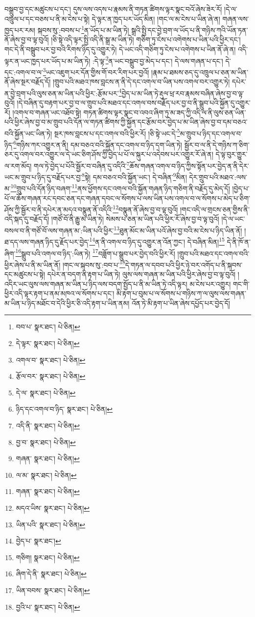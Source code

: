 བསྒྲུབ་བྱ་དང་མཚུངས་པ་དང་། དུས་ལས་འདས་པ་རྣམས་ནི་གཏན་ཚིགས་ལྟར་སྣང་བའོ་ཞེས་ཟེར་རོ། །དེ་ལ་འཁྲུལ་པ་དང་བཅས་པ་ནི་མ་ངེས་པ་སྟེ། དེ་ལྟར་ན་ཁྱད་པར་ཡོད་མིན། །གང་ལ་མ་ངེས་པ་ཡིན་ཞེ་ན། གཞན་ལས་ཁྱད་པར་རམ། སྐབས་སུ་:བབས་པ་\footnote{བབ་པ་  སྣར་ཐང་།  པེ་ཅིན། }ན་ཡོད་པ་མ་ཡིན་ཏེ། སྒྲའི་སྤྱི་དང་བྱེ་བྲག་ལ་ཡོད་པ་ནི་གཉིས་ཀའི་ཡོན་ཏན་ནོ་ཞེས་བྱ་བ་ལྟ་བུའོ། །ཅི་སྟེ་འདི་ལྟར་སྤྱི་འདི་ནི་སྒྲ་མ་ཡིན་ཏེ། གཅིག་ཏུ་ངེས་པ་འགེགས་པ་ཡིན་པའི་ཕྱིར་དང་། གང་དེ་ནི་བསྒྲུབ་པར་བྱ་བའི་རིགས་ཉིད་དུ་འགྱུར་ཏེ། དེ་ཡང་འདི་གཅིག་ཏུ་ངེས་པ་འགེགས་པ་ཡིན་ནོ་ཞེ་ན། འདི་ལྟར་ན་ཡང་ཁྱད་པར་ཡོད་པ་མ་ཡིན་ཏེ། :དེ་ལྟ་\footnote{དེ་ལྟར་  སྣར་ཐང་།  པེ་ཅིན། }ན་ཡང་བསྒྲུབ་བྱ་མེད་པ་དང་། དེ་ལས་གཞན་པ་དང་། དེ་དང་:འགལ་བ་ལ་\footnote{འགལ་བ་  སྣར་ཐང་།  པེ་ཅིན། }ཡང་འཇུག་པར་དོན་གྱིས་གོ་བར་རིག་པར་བྱའོ། །རྣམ་པ་ཐམས་ཅད་དུ་འཁྲུལ་པ་ཅན་མ་ཡིན་ནོ་ཞེས་སྔར་བརྗོད་དོ། །གྲུབ་པའི་མཐའ་ཁས་བླངས་ན་ནི་དེ་དང་འགལ་བ་ཡིན་པས་འགལ་བར་འགྱུར་ཏེ། དཔེར་ན་བྱེ་བྲག་པའི་ལུས་ཅན་མ་ཡིན་པའི་ཕྱིར་:རྩོམ་པར་\footnote{རྩོལ་བར་  སྣར་ཐང་།  པེ་ཅིན། }བྱེད་པ་མ་ཡིན་ཏེ་རྡུལ་ཕྲ་རབ་རྣམས་བཞིན་ཞེས་བྱ་བ་ལྟ་བུའོ། །དེ་བཞིན་དུ་བརྟག་པར་བྱ་བ་ལ་གྲུབ་པའི་མཐའ་དང་འགལ་བས་བརྗོད་པར་བྱ་བ་ནི་སྒྲུབ་པའི་སྐྱོན་དུ་འགྱུར་རོ། །འགལ་བ་གཞན་ཡང་འཐོབ་སྟེ། གཏན་ཚིགས་ལྟར་སྣང་བ་འབའ་ཞིག་ཏུ་མ་ཟད་ཀྱི་འདི་ལ་ནི་ལུས་ཅན་ཡིན་པའི་ཕྱིར་ཞེས་བྱ་བ་མ་གྲུབ་པའི་དོན་ལ་གཏན་ཚིགས་ཀྱི་སྐྱོན་དང་རྩོམ་བར་བྱེད་པ་མ་ཡིན་ཞེས་བྱ་བ་དམ་བཅའ་བའི་སྐྱོན་ཡང་ཡིན་ཏེ། སྔར་ཁས་བླངས་པ་དང་འགལ་བའི་ཕྱིར་རོ། །ཅི་སྟེ་ཡང་དེ་\footnote{དེ་ལ་  སྣར་ཐང་།  པེ་ཅིན། }མ་གྲུབ་པ་ཉིད་དང་འགལ་བ་ཉིད་\footnote{ཉིད་དང་འགལ་བ་ཉིད་  སྣར་ཐང་།  པེ་ཅིན། }གཉིས་ཀར་འགྱུར་ན་ནི། དམ་བཅའ་བའི་སྐྱོན་དང་འགལ་བ་ཉིད་དག་ཡིན་ཏེ། སྦྱོར་བ་ལ་ནི་དེ་གཉིས་ཀ་ཅིག་ཅར་དུ་འགལ་བར་འགྱུར་ལ་དེ་ཡང་ཅིག་ཤོས་ཀྱི་བྱེད་པ་པོ་ལ་སྐུར་པ་འདེབས་པར་འགྱུར་རོ་ཞེ་ན། དེ་ལྟ་བུར་གྱུར་ལ་རག་མོད། གལ་ཏེ་བྱེད་པ་པོའི་སྦྱོར་བ་བཞིན་དུ་འདིའི་\footnote{འདི་ནི་  སྣར་ཐང་།  པེ་ཅིན། }ཆོས་གཞན་འགལ་བ་ཉིད་ཀྱིས་སྟོན་པར་བྱེད་ན་ནི་དེར་ཡང་མ་གྲུབ་པ་ཉིད་དུ་བརྗོད་པར་བྱ་\footnote{བྱ་བ་  སྣར་ཐང་།  པེ་ཅིན། }སྟེ། དམ་བཅའ་བའི་སྐྱོན་ཡང་། དེ་བཞིན་\footnote{གཞན་  སྣར་ཐང་།  པེ་ཅིན། }མིན། དེར་གྲུབ་པའི་མཐའ་:ལས་མ་\footnote{ལ་མ་  སྣར་ཐང་།  པེ་ཅིན། }གྲུབ་པའི་དོན་ཉིད་བཞག་\footnote{གཞན་  སྣར་ཐང་།  པེ་ཅིན། }ནས་ཕྱོགས་དང་འགལ་བའི་སྐྱོན་གཞན་ཉིད་གཅིག་ནི་བརྗོད་དུ་མེད་དོ། །བྱེད་པ་པོ་ལ་ཆོས་གཞན་རང་དབང་ཅན་དང་གཞན་དབང་ལ་སོགས་པ་ལས་ཡིན་པས་འགལ་བ་ལ་སོགས་པ་མེད་པ་ཅིག་ཤོས་ཀྱི་སྦྱོར་བ་ནི་དཔེར་ན་མདའ་བསྣུན་ནོ་འདིའི་\footnote{མདའ་ཡིས་  སྣར་ཐང་།  པེ་ཅིན། }བསྣུན་ནོ་ཞེས་བྱ་བ་ལྟ་བུའོ། །གང་འདི་ལ་གྲངས་ཅན་གྱིས་ནི་འདི་སྐད་དུ་བརྗོད་དོ། །གཙོ་བོ་ནི་རྒྱུ་མ་ཡིན་ཏེ། སེམས་པ་ཅན་མ་ཡིན་པའི་ཕྱིར་རོ་ཞེས་བྱ་བ་ལྟ་བུའོ། །དེ་ལ་ཡང་བསལ་བ་ནི་གཙོ་བོ་ལས་གཞན་མ་:ཡིན་པའི་ཕྱིར་\footnote{ཡིན་པའི་  སྣར་ཐང་།  པེ་ཅིན། }ཐུན་མོང་མ་ཡིན་པའོ་ཞེས་བྱ་བའི་མ་ངེས་པ་ཉིད་ཡིན་ནོ། །ཐ་དད་ལས་གཞན་ཉིད་དུ་རྗོད་པར་བྱེད་\footnote{བྱེད་པ་  སྣར་ཐང་། }ན་ནི་འགལ་བ་ཉིད་དུ་འགྱུར་ན་འོན་ཀྱང་། དེ་བཞིན་མིན།\footnote{གཅིག།  སྣར་ཐང་།  པེ་ཅིན། } དེ་ནི་ཁོ་ན་ཞིག་\footnote{ཞིག་དེ་ནི་  སྣར་ཐང་།  པེ་ཅིན། }སྒྲུབ་པའི་འགལ་བ་ཉིད་:ཡིན་ཏེ། \footnote{ཡིན་བབས་  སྣར་ཐང་།  པེ་ཅིན། }བཟློག་པ་སྒྲུབ་པར་བྱེད་བའི་ཕྱིར་རོ། །གྲུབ་པའི་མཐའ་དང་འགལ་བའི་ཕྱིར་ཞེས་པ་ནི་མ་ཡིན་ནོ། །གང་ལ་སྐབས་སུ་:བབ་པ་\footnote{བྱའི་པ་  སྣར་ཐང་།  པེ་ཅིན། }དེ་གཏན་ལ་དབབ་པའི་ཕྱིར་ཉེ་བར་འགོད་པ་ནི་སྐབས་དང་མཚུངས་པ་སྟེ། དཔེར་ན་བདག་ནི་རྟག་པ་ཡིན་ཏེ། ལུས་ལས་གཞན་མ་ཡིན་པའི་ཕྱིར་ཞེས་བྱ་བ་ལྟ་བུའོ། །འདིར་ཡང་ལུས་ལས་གཞན་མ་ཡིན་པ་ཉིད་ལས་བདག་སྤྱོད་པ་ནི་མ་ཡིན་ཏེ་འདི་ལྟར། མ་ངེས་པར་འགྱུར། གང་གི་ཕྱིར་འདི་ལྟར་རྟག་པ་ནམ་མཁའ་ལ་སོགས་པ་དང་། མི་རྟག་པ་བུམ་པ་ལ་སོགས་པ་གཉིས་ཀ་ལ་ལུས་ལས་གཞན་མ་ཡིན་པ་ཉིད་མཐོང་བ་དེའི་ཕྱིར་ཅི་འདི་རྟག་པ་ཡིན་ནམ། འོན་ཏེ་མི་རྟག་པ་ཡིན་ཞེས་དཔྱོད་པར་བྱེད་དོ། 